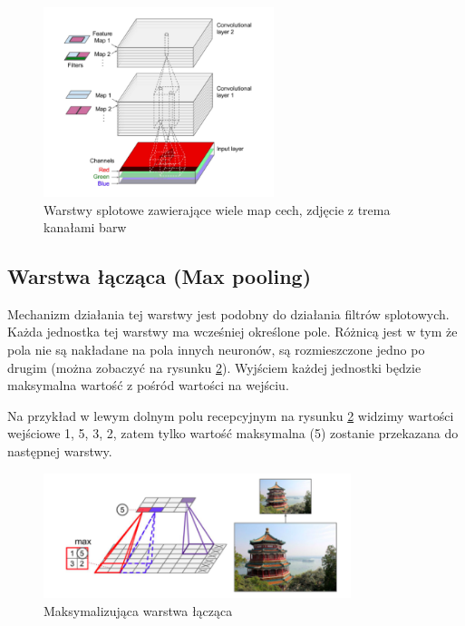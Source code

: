 \documentclass{article}
\begin{document}
\begin{figure}[H]
	\centering
	\includegraphics[width=0.6\textwidth,keepaspectratio=true]{stosy_map_cech}
	\caption{Warstwy splotowe zawierające wiele map cech, zdjęcie z trema kanałami barw \cite{geron}}
	\label{stosy_map_cech}
\end{figure}

\subsection{Warstwa łącząca (Max pooling)}
Mechanizm działania tej warstwy jest podobny do działania filtrów splotowych. Każda jednostka tej warstwy ma wcześniej określone pole. Różnicą jest w tym że pola nie są nakładane na pola innych neuronów, są rozmieszczone jedno po drugim (można zobaczyć na rysunku \ref{max_pooling}). Wyjściem każdej jednostki będzie maksymalna wartość z pośród wartości na wejściu.

Na przykład w lewym dolnym polu recepcyjnym na rysunku \ref{max_pooling} widzimy wartości wejściowe 1, 5, 3, 2, zatem tylko wartość maksymalna (5) zostanie przekazana do następnej warstwy. \cite{geron}

\begin{figure}[H]
	\centering
	\includegraphics[width=0.8\textwidth,keepaspectratio=true]{max_pooling}
	\caption{Maksymalizująca warstwa łącząca \cite{geron}}
	\label{max_pooling}
\end{figure}
\end{document}
